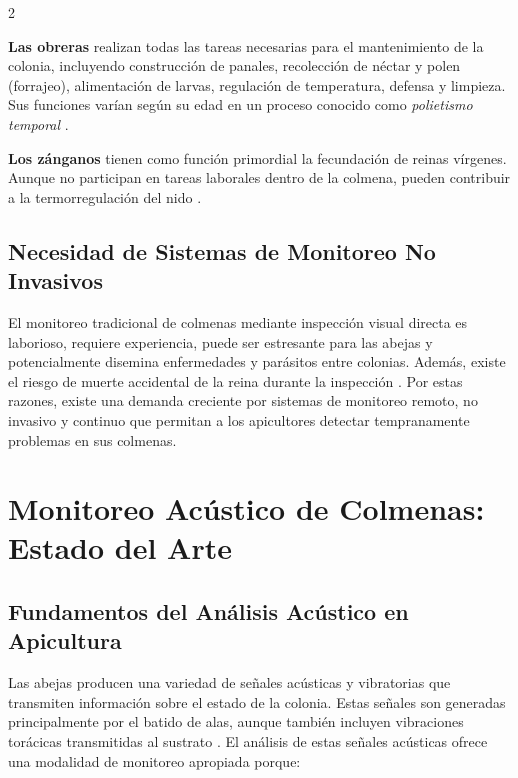 \documentclass[12pt]{report}
\newenvironment{tightmulticols}{%
  \begin{multicols}{2}
  \setlength{\parskip}{1.2pt}
  \linespread{1}\selectfont
}{%
  \end{multicols}
}
\begin{document}
\begin{tightmulticols}
\par \textbf{Las obreras} realizan todas las tareas necesarias para el mantenimiento de la colonia, incluyendo construcción de panales, recolección de néctar y polen (forrajeo), alimentación de larvas, regulación de temperatura, defensa y limpieza. Sus funciones varían según su edad en un proceso conocido como \textit{polietismo temporal} \cite{ruvinga2021}.

\par \textbf{Los zánganos} tienen como función primordial la fecundación de reinas vírgenes. Aunque no participan en tareas laborales dentro de la colmena, pueden contribuir a la termorregulación del nido \cite{ruvinga2021}.

\subsection{Necesidad de Sistemas de Monitoreo No Invasivos}

\noindent El monitoreo tradicional de colmenas mediante inspección visual directa es laborioso, requiere experiencia, puede ser estresante para las abejas y potencialmente disemina enfermedades y parásitos entre colonias. Además, existe el riesgo de muerte accidental de la reina durante la inspección \cite{ruvinga2023}. Por estas razones, existe una demanda creciente por sistemas de monitoreo remoto, no invasivo y continuo que permitan a los apicultores detectar tempranamente problemas en sus colmenas.


\section{Monitoreo Acústico de Colmenas: Estado del Arte}

\subsection{Fundamentos del Análisis Acústico en Apicultura}

\noindent Las abejas producen una variedad de señales acústicas y vibratorias que transmiten información sobre el estado de la colonia. Estas señales son generadas principalmente por el batido de alas, aunque también incluyen vibraciones torácicas transmitidas al sustrato \cite{howard2013}. El análisis de estas señales acústicas ofrece una modalidad de monitoreo apropiada porque:


\end{tightmulticols}
\end{document}

